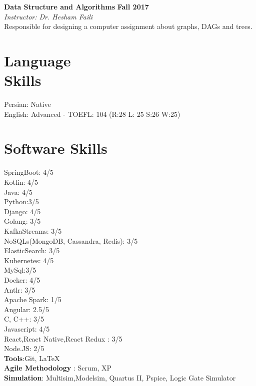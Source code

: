 \documentclass[line, mm]{sampleCV}
\begin{document}
\begin{resume}
\textbf{Data Structure and Algorithms} \hfill \textbf{Fall 2017}\\
{\it Instructor:  Dr. Hesham Faili}\\
Responsible for designing a computer assignment about graphs, DAGs and trees.



    \section{\mysidestyle Language\\Skills}
Persian: Native\\
English: Advanced - TOEFL: 104 (R:28 L: 25 S:26 W:25)\\

    \section{\mysidestyle Software Skills}

SpringBoot: 4/5\\Kotlin: 4/5\\ Java: 4/5 \\ Python:3/5\\ Django: 4/5 \\ Golang: 3/5 \\ KafkaStreams: 3/5\\NoSQLs(MongoDB, Cassandra, Redis): 3/5 \\ ElasticSearch: 3/5  \\ Kubernetes: 4/5 \\ MySql:3/5 \\Docker: 4/5 \\ Antlr: 3/5 \\  Apache Spark: 1/5\\
Angular: 2.5/5 \\
 C, C++: 3/5\\Javascript: 4/5\\
 React,React Native,React Redux : 3/5 \\Node.JS: 2/5\\ 
\textbf{Tools}:Git, \LaTeX \\
\textbf{Agile Methodology} : Scrum, XP \\
\textbf{Simulation}: Multisim,Modelsim, Quartus II, Pspice, Logic Gate Simulator

\end{resume}
\end{document}
